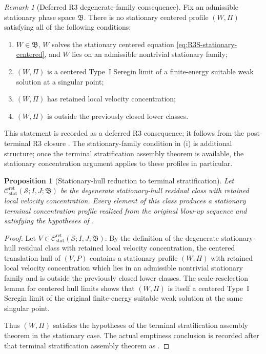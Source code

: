 \documentclass[11pt]{amsart}
\numberwithin{equation}{section}
\theoremstyle{plain}
\newtheorem{proposition}[proposition]{Proposition}
\theoremstyle{definition}
\theoremstyle{remark}
\newtheorem{remark}[remark]{Remark}
\newcommand{\Cstat}{\mathcal C_{\mathrm{stat}}^{\mathrm{ret}}}
\begin{document}
\begin{remark}[Deferred R3 degenerate-family consequence]
\label{cor:R3S-no-active-degenerate-family}
Fix an admissible stationary phase space \(\mathfrak B\).  There is no stationary
centered profile \((W,\Pi)\) satisfying all of the following conditions:
\begin{enumerate}[label=(\roman*)]
   \item \(W\in\mathfrak B\), \(W\) solves the stationary centered equation
   \eqref{eq:R3S-stationary-centered}, and \(W\) lies on an admissible
   nontrivial stationary family;
   \item \((W,\Pi)\) is a centered Type~I Seregin limit of a finite-energy
   suitable weak solution at a singular point;
   \item \((W,\Pi)\) has retained local velocity concentration;
   \item \((W,\Pi)\) is outside the previously closed lower classes.
\end{enumerate}
This statement is recorded as a deferred R3 consequence; it follows from the
post-terminal R3 closure .  The stationary-family
condition in \textup{(i)} is additional structure; once the terminal
stratification assembly theorem is available, the stationary concentration
argument applies to these profiles in particular.
\end{remark}

\begin{proposition}[Stationary-hull reduction to terminal stratification]
\label{prop:R3S-R3-terminal-reduction}
Let \(\Cstat(\mathcal S;I,J;\mathfrak B)\) be the degenerate
stationary-hull residual class with retained local velocity concentration.  Every
element of this class produces a stationary terminal concentration profile
realized from the original blow-up sequence and satisfying the hypotheses of
.
\end{proposition}

\begin{proof}
Let \(V\in\Cstat(\mathcal S;I,J;\mathfrak B)\).  By the
definition of the degenerate stationary-hull residual class with retained local
velocity concentration, the centered translation hull of \((V,P)\) contains a stationary
profile \((W,\Pi)\) with retained local velocity concentration
which lies in an admissible nontrivial stationary family and is outside the
previously closed lower classes.  The scale-reselection lemma for centered hull
limits shows that \((W,\Pi)\) is itself a centered Type~I Seregin limit of the
original finite-energy suitable weak solution at the same singular point.

Thus \((W,\Pi)\) satisfies the hypotheses of the terminal stratification
assembly theorem in the stationary case.  The actual emptiness conclusion is recorded
after that terminal stratification assembly theorem as .
\end{proof}
\end{document}
